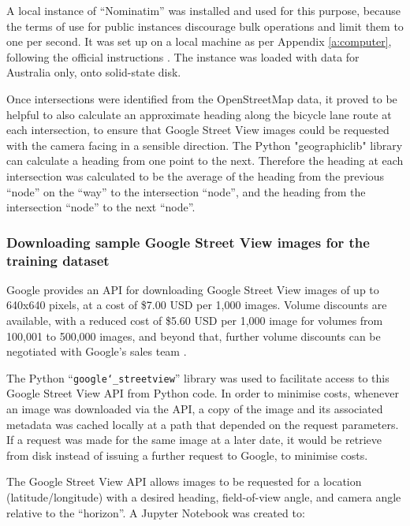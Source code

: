\documentclass[11pt,twoside]{report}
\begin{document}
A local instance of ``Nominatim'' was installed and used for this purpose, because the terms of use for public instances discourage bulk operations and limit them to one per second.  It was set up on a local machine as per Appendix \ref{a:computer}, following the official instructions \cite{nominatim_install}.  The instance was loaded with data for Australia only, onto solid-state disk.

Once intersections were identified from the OpenStreetMap data, it proved to be helpful to also calculate an approximate heading along the bicycle lane route at each intersection, to ensure that Google Street View images could be requested with the camera facing in a sensible direction.  The Python "geographiclib" library can calculate a heading from one point to the next.  Therefore the heading at each intersection was calculated to be the average of the heading from the previous ``node'' on the ``way'' to the intersection ``node'', and the heading from the intersection 	``node'' to the next ``node''.

\subsubsection{Downloading sample Google Street View images for the training dataset}
\label{s:sample}

Google provides an API for downloading Google Street View images of up to 640x640 pixels, at a cost of \$7.00 USD per 1,000 images.  Volume discounts are available, with a reduced cost of \$5.60 USD per 1,000 image for volumes from 100,001 to 500,000 images, and beyond that, further volume discounts can be negotiated with Google's sales team \cite{gsv_billing}.

The Python ``\texttt{google\char`_streetview}'' library was used to facilitate access to this Google Street View API from Python code.  In order to minimise costs, whenever an image was downloaded via the API, a copy of the image and its associated metadata was cached locally at a path that depended on the request parameters.  If a request was made for the same image at a later date, it would be retrieve from disk instead of issuing a further request to Google, to minimise costs.

The Google Street View API allows images to be requested for a location (latitude/longitude) with a desired heading, field-of-view angle, and camera angle relative to the ``horizon''.  A Jupyter Notebook was created to:
\end{document}
